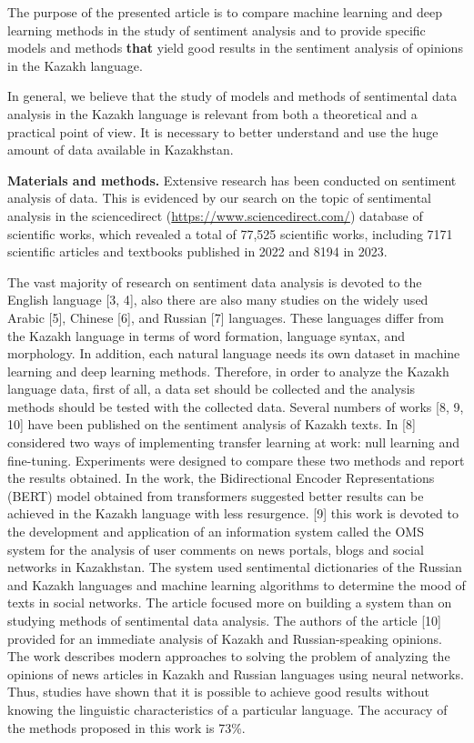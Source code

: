 \begin{multicols}{2}
The purpose of the presented article is to compare machine learning and
deep learning methods in the study of sentiment analysis and to provide
specific models and methods {\bfseries that} yield good results in the
sentiment analysis of opinions in the Kazakh language.

In general, we believe that the study of models and methods of
sentimental data analysis in the Kazakh language is relevant from both a
theoretical and a practical point of view. It is necessary to better
understand and use the huge amount of data available in Kazakhstan.

{\bfseries Materials and methods.} Extensive research has been conducted on
sentiment analysis of data. This is evidenced by our search on the topic
of sentimental analysis in the sciencedirect
(\url{https://www.sciencedirect.com/}) database of scientific works,
which revealed a total of 77,525 scientific works, including 7171
scientific articles and textbooks published in 2022 and 8194 in 2023.

The vast majority of research on sentiment data analysis is devoted to
the English language {[}3, 4{]}, also there are also many studies on the
widely used Arabic {[}5{]}, Chinese {[}6{]}, and Russian {[}7{]}
languages. These languages differ from the Kazakh language in terms of
word formation, language syntax, and morphology. In addition, each
natural language needs its own dataset in machine learning and deep
learning methods. Therefore, in order to analyze the Kazakh language
data, first of all, a data set should be collected and the analysis
methods should be tested with the collected data. Several numbers of
works {[}8, 9, 10{]} have been published on the sentiment analysis of
Kazakh texts. In {[}8{]} considered two ways of implementing transfer
learning at work: null learning and fine-tuning. Experiments were
designed to compare these two methods and report the results obtained.
In the work, the Bidirectional Encoder Representations (BERT) model
obtained from transformers suggested better results can be achieved in
the Kazakh language with less resurgence. {[}9{]} this work is devoted
to the development and application of an information system called the
OMS system for the analysis of user comments on news portals, blogs and
social networks in Kazakhstan. The system used sentimental dictionaries
of the Russian and Kazakh languages and machine learning algorithms to
determine the mood of texts in social networks. The article focused more
on building a system than on studying methods of sentimental data
analysis. The authors of the article {[}10{]} provided for an immediate
analysis of Kazakh and Russian-speaking opinions. The work describes
modern approaches to solving the problem of analyzing the opinions of
news articles in Kazakh and Russian languages using neural networks.
Thus, studies have shown that it is possible to achieve good results
without knowing the linguistic characteristics of a particular language.
The accuracy of the methods proposed in this work is 73\%.


\end{multicols}
